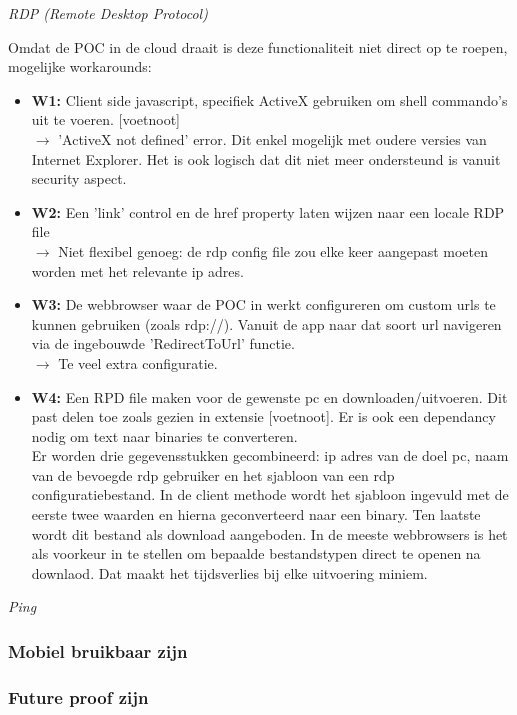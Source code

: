 \textit{RDP (Remote Desktop Protocol)}

Omdat de POC in de cloud draait is deze functionaliteit niet direct op te roepen, mogelijke workarounds:
\begin{itemize}
    \item \textbf{W1:} Client side javascript, specifiek ActiveX gebruiken om shell commando's uit te voeren. [voetnoot]\\
    $\rightarrow$ 'ActiveX not defined' error. Dit enkel mogelijk met oudere versies van Internet Explorer. Het is ook logisch dat dit niet meer ondersteund is vanuit security aspect.
    \item \textbf{W2:} Een 'link' control en de href property laten wijzen naar een locale RDP file\\
    $\rightarrow$ Niet flexibel genoeg: de rdp config file zou elke keer aangepast moeten worden met het relevante ip adres.
    \item \textbf{W3:} De webbrowser waar de POC in werkt configureren om custom urls te kunnen gebruiken (zoals rdp://). Vanuit de app naar dat soort url navigeren via de ingebouwde 'RedirectToUrl' functie.\\
    $\rightarrow$ Te veel extra configuratie.
    \item \textbf{W4:} Een RPD file maken voor de gewenste pc en downloaden/uitvoeren. Dit past delen toe zoals gezien in extensie [voetnoot]. Er is ook een dependancy nodig om text naar binaries te converteren.\\
    Er worden drie gegevensstukken gecombineerd: ip adres van de doel pc, naam van de bevoegde rdp gebruiker en het sjabloon van een rdp configuratiebestand. In de client methode wordt het sjabloon ingevuld met de eerste twee waarden en hierna geconverteerd naar een binary. Ten laatste wordt dit bestand als download aangeboden. In de meeste webbrowsers is het als voorkeur in te stellen om bepaalde bestandstypen direct te openen na downlaod. Dat maakt het tijdsverlies bij elke uitvoering miniem.
\end{itemize}

\textit{Ping}


\subsubsection{Mobiel bruikbaar zijn}
\subsubsection{Future proof zijn}
